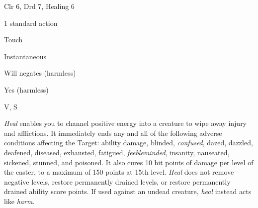 
\begin{description*}
\item[Level:] Clr 6, Drd 7, Healing 6
\item[Casting Time:] 1 standard action
\item[Range:] Touch
\item[Duration:] Instantaneous
\item[Saving Throw:] Will negates (harmless)
\item[Spell Resistance:] Yes (harmless)
\item[Components:] V, S
\end{description*}

\textit{Heal} enables you to channel positive energy into a creature to wipe away
injury and afflictions. It immediately ends any and all of the following adverse
conditions affecting the Target: ability damage, blinded, \textit{confused}, dazed,
dazzled, deafened, diseased, exhausted, fatigued, \textit{feebleminded}, insanity,
nauseated, sickened, stunned, and poisoned. It also cures 10 hit points of damage
per level of the caster, to a maximum of 150 points at 15th level.
\textit{Heal} does not remove negative levels, restore permanently drained levels,
or restore permanently drained ability score points.
If used against an undead creature, \textit{heal} instead acts like \textit{harm}.